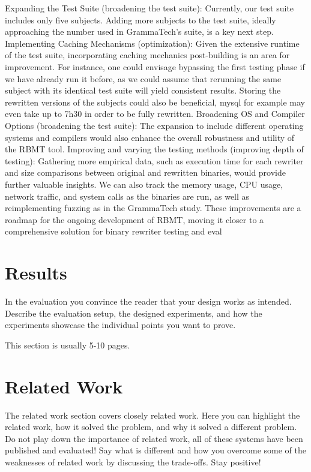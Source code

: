 \documentclass[a4paper,11pt,oneside]{report}
\begin{document}
Expanding the Test Suite (broadening the test suite): Currently, our test suite
includes only five subjects. Adding more subjects to the test suite, ideally approaching the
number used in GrammaTech's suite, is a key next step.
Implementing Caching Mechanisms (optimization): Given the extensive runtime of
the test suite, incorporating caching mechanics post-building is an area for improvement.
For instance, one could envisage bypassing the first testing phase if we have already run it
before, as we could assume that rerunning the same subject with its identical test suite will
yield consistent results. Storing the rewritten versions of the subjects could also be
beneficial, mysql for example may even take up to 7h30 in order to be fully rewritten.
Broadening OS and Compiler Options (broadening the test suite): The expansion
to include different operating systems and compilers would also enhance the overall
robustness and utility of the RBMT tool.
Improving and varying the testing methods (improving depth of testing):
Gathering more empirical data, such as execution time for each rewriter and size
comparisons between original and rewritten binaries, would provide further valuable
insights. We can also track the memory usage, CPU usage, network traffic, and system calls
as the binaries are run, as well as reimplementing fuzzing as in the GrammaTech study.
These improvements are a roadmap for the ongoing development of RBMT, moving
it closer to a comprehensive solution for binary rewriter testing and eval

\chapter{Results}

In the evaluation you convince the reader that your design works as intended.
Describe the evaluation setup, the designed experiments, and how the
experiments showcase the individual points you want to prove.

This section is usually 5-10 pages.


\chapter{Related Work}

The related work section covers closely related work. Here you can highlight
the related work, how it solved the problem, and why it solved a different
problem. Do not play down the importance of related work, all of these
systems have been published and evaluated! Say what is different and how
you overcome some of the weaknesses of related work by discussing the 
trade-offs. Stay positive!
\end{document}
